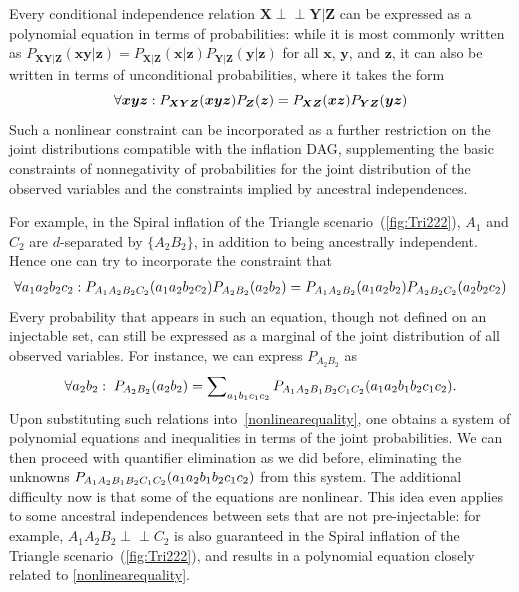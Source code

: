 \documentclass[aps,english,superscriptaddress,onecolumn,twoside,longbibliography,pra,floatfix,fleqn,nofootinbib]{revtex4-1}%
\theoremstyle{definition}
\newcounter{example}[section]
\newcommand{\p}[2][]{{P_{#1}}\parenths{#2}}
\newcommand{\pfunc}[1]{P_{#1}}
\newcommand{\indep}{\perp\!\!\!\!\perp} %
\DeclarePairedDelimiter{\parenths}{\lparen}{\rparen}
\begin{document}
Every conditional independence relation $\bm{X}\indep\bm{Y}|\bm{Z}$ can be expressed as a polynomial equation in terms of probabilities: while it is most commonly written as $P_{\bm{X}\bm{Y}|\bm{Z}}(\bm{x}\bm{y}|\bm{z})=P_{\bm{X}|\bm{Z}}(\bm{x}|\bm{z})P_{\bm{Y}|\bm{Z}}(\bm{y}|\bm{z})$ for all $\bm{x}$, $\bm{y}$, and $\bm{z}$, it can also be written in terms of unconditional probabilities, where it takes the form
\[
\forall{\bm{x} \bm{y} \bm{z}}: \p[\bm{X}\bm{Y}\bm{Z}]{\bm{x}\bm{y}\bm{z}}\p[\bm{Z}]{\bm{z}}=\p[\bm{X}\bm{Z}]{\bm{x}\bm{z}}\p[\bm{Y}\bm{Z}]{\bm{y}\bm{z}}
\]
Such a nonlinear constraint can be incorporated as a further restriction on the joint distributions compatible with the inflation DAG, supplementing the basic constraints of nonnegativity of probabilities for the joint distribution of the observed variables and the constraints implied by ancestral independences.

For example, in the Spiral inflation of the Triangle scenario~(\cref{fig:Tri222}), $A_1$ and $C_2$ are $d$-separated by $\{A_2 B_2\}$, in addition to being ancestrally independent. Hence one can try to incorporate the constraint that 
\begin{align}\label{nonlinearequality}
\forall{a_1 a_2 b_2 c_2}: \p[A_1 A_2 B_2 C_2]{a_1 a_2 b_2 c_2}\p[A_2 B_2]{a_2 b_2}=\p[A_1 A_2 B_2]{a_1 a_2 b_2}\p[A_2 B_2 C_2]{a_2 b_2 c_2}
\end{align}
 Every probability that appears in such an equation, though not defined on an injectable set, can still be expressed as a marginal of the joint distribution of all observed variables.  For instance, we can express $\pfunc{A_2 B_2}$ as
\begin{align}
\forall{a_2 b_2}:\;\p[A_2 B_2]{a_2 b_2} = \sum\nolimits_{a_1 b_1 c_1 c_2}\p[A_1 A_2 B_1 B_2 C_1 C_2]{a_1 a_2 b_1 b_2 c_1 c_2}.
\end{align}
Upon substituting such relations into~\cref{nonlinearequality}, one obtains a system of polynomial equations and inequalities in terms of the joint probabilities.  We can then proceed with quantifier elimination as we did before, eliminating the unknowns $\p[A_1 A_2 B_1 B_2 C_1 C_2]{a_1 a_2 b_1 b_2 c_1 c_2}$ from this system. The additional difficulty now is that some of the equations are nonlinear. This idea even applies to some ancestral independences between sets that are not pre-injectable: for example, $A_1 A_2 B_2 \indep C_2$ is also guaranteed in the Spiral inflation of the Triangle scenario~(\cref{fig:Tri222}), and results in a polynomial equation closely related to \cref{nonlinearequality}.
\end{document}

